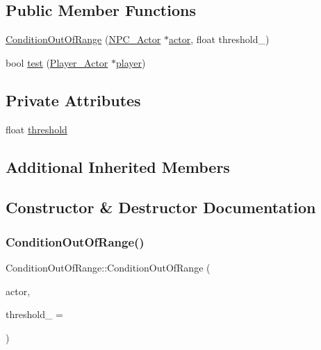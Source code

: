 \subsection*{Public Member Functions}
\begin{DoxyCompactItemize}
\item 
\hyperlink{classConditionOutOfRange_a813b69e01d92c426fd868a2a38015e0c}{Condition\+Out\+Of\+Range} (\hyperlink{classNPC__Actor}{N\+P\+C\+\_\+\+Actor} $\ast$\hyperlink{classCondition_a95c8585457c094a8564ac5111e66620d}{actor}, float threshold\+\_)
\item 
bool \hyperlink{classConditionOutOfRange_a8e09e943dedb3c8b482e5934975abc25}{test} (\hyperlink{classPlayer__Actor}{Player\+\_\+\+Actor} $\ast$\hyperlink{game__play__state_8cpp_ac65a4bc85dcd7c1cefbc84425f42fc46}{player})
\end{DoxyCompactItemize}
\subsection*{Private Attributes}
\begin{DoxyCompactItemize}
\item 
float \hyperlink{classConditionOutOfRange_a2a9d369ba3db698dcc41e928ec0aa211}{threshold}
\end{DoxyCompactItemize}
\subsection*{Additional Inherited Members}


\subsection{Constructor \& Destructor Documentation}
\mbox{\label{classConditionOutOfRange_a813b69e01d92c426fd868a2a38015e0c}} 
\subsubsection{\texorpdfstring{Condition\+Out\+Of\+Range()}{ConditionOutOfRange()}}
{\footnotesize\ttfamily Condition\+Out\+Of\+Range\+::\+Condition\+Out\+Of\+Range (\begin{DoxyParamCaption}\item[{\hyperlink{classNPC__Actor}{N\+P\+C\+\_\+\+Actor} $\ast$}]{actor,  }\item[{float}]{threshold\+\_\+ = {} }\end{DoxyParamCaption})\hspace{0.3cm}{\ttfamily [inline]}}



